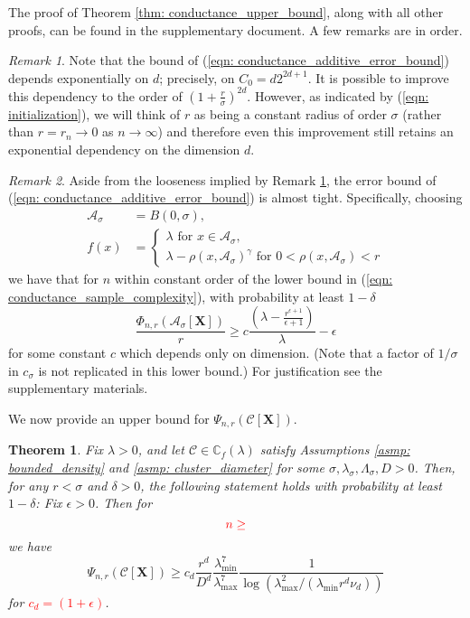\documentclass{article}
\newcommand{\1}{\mathbf{1}}
\newcommand{\Xbf}{\mathbf{X}}
\newcommand{\Cbb}{\mathbb{C}}
\newcommand{\Cset}{\mathcal{C}}
\newcommand{\Aset}{\mathcal{A}}
\newcommand{\Asig}{\Aset_{\sigma}}
\theoremstyle{aldenthm}
\newtheorem{theorem}{Theorem}
\theoremstyle{remark}
\newtheorem{remark}{Remark}
\begin{document}
The proof of Theorem \ref{thm: conductance_upper_bound}, along with all other proofs, can be found in the supplementary document. A few remarks are in order. 
\begin{remark}
	\label{rem: exp_in_d}
	Note that the bound of (\ref{eqn: conductance_additive_error_bound}) depends exponentially on $d$; precisely, on $C_0 = d2^{2d +1}$. It is possible to improve this dependency to the order of $(1 + \frac{r}{\sigma})^{2d}$. However, as indicated by (\ref{eqn: initialization}), we will think of $r$ as being a constant radius of order $\sigma$ (rather than $r = r_n \to 0$ as $n \to \infty$) and therefore even this improvement still retains an exponential dependency on the dimension $d$.
\end{remark}
\begin{remark}
	Aside from the looseness implied by Remark \ref{rem: exp_in_d}, the error bound of (\ref{eqn: conductance_additive_error_bound}) is almost tight. Specifically, choosing
	\begin{align*}
	\Asig & = B(0,\sigma), \\
	 f(x) & = 
	 \begin{cases}
	 \lambda \text{ for $x \in \Asig$}, \\
	 \lambda - \rho(x,\Asig)^{\gamma} \text{ for $0 < \rho(x,\Asig) < r$}
	 \end{cases}
	\end{align*}
	we have that for $n$ within constant order of the lower bound in (\ref{eqn: conductance_sample_complexity}), with probability at least $1 - \delta$
	\begin{equation*}
	\frac{\Phi_{n,r}(\Asig[\mathbf{X}])}{r} \geq c \frac{(\lambda - \frac{r^{\epsilon+1}}{\epsilon+1})}{\lambda} - \epsilon
	\end{equation*}
	for some constant $c$ which depends only on dimension. (Note that a factor of $1 / \sigma$ in $c_{\sigma}$ is not replicated in this lower bound.) For justification see the supplementary materials.
\end{remark}

We now provide an upper bound for $\Psi_{n,r}(\Cset[\Xbf])$.
\begin{theorem}
	\label{thm: inverse_mixing_time_lower_bound}
	Fix $\lambda > 0$, and let $\Cset \in \Cbb_f(\lambda)$ satisfy Assumptions \ref{asmp: bounded_density} and \ref{asmp: cluster_diameter} for some $\sigma, \lambda_{\sigma}, \Lambda_{\sigma}, D > 0$. Then, for any $r < \sigma$ and $\delta > 0$, the following statement holds with probability at least $1 - \delta$:  Fix $\epsilon > 0$. Then for
	\begin{equation*}
	\textcolor{red}{n \geq }
	\end{equation*}
	we have
	\begin{equation*}
	\Psi_{n,r}(\Cset[\Xbf]) \geq c_d \frac{r^d}{D^d} \frac{\lambda_{\min}^7}{\lambda_{\max}^7} \frac{1}{\log(\lambda_{\max}^2/(\lambda_{\min} r^d \nu_d))}
	\end{equation*}
	for \textcolor{red}{$c_d = (1 + \epsilon)$}.
\end{theorem}
\end{document}
